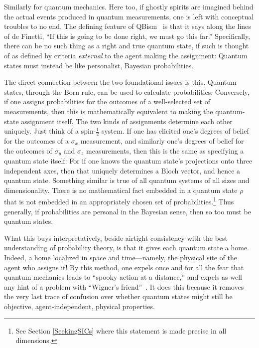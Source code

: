 \documentclass[aps,pra,superscriptaddress,12pt,tightenlines,nofootinbib]{revtex4-2}
\begin{document}
Similarly for quantum mechanics.  Here too, if ghostly spirits are imagined behind the actual events produced in quantum measurements, one is left with conceptual troubles to no end.  The defining feature of QBism~\cite{Caves02,Fuchs02,Fuchs04,Caves07,RMP,Fuchs10,Mermin13,Fuchs10b,AJP,Mermin14,stacey-vonneumann,Baeyer16} is that it says along the lines of de Finetti, ``If this is going to be done right, we must go this far.''  Specifically, there can be no such thing as a right and true quantum state, if such is thought of as defined by criteria {\it external\/} to the agent making the assignment:  Quantum states must instead be like personalist, Bayesian probabilities.

The direct connection between the two foundational issues is this.  Quantum states, through the Born rule, can be used to calculate probabilities.  Conversely, if one assigns probabilities for the outcomes of a well-selected set of measurements, then this is mathematically equivalent to making the quantum-state assignment itself.  The two kinds of assignments determine each other uniquely.  Just think of a spin-$\frac{1}{2}$ system.  If one has elicited one's degrees of belief for the outcomes of a $\sigma_x$ measurement, and similarly one's degrees of belief for the outcomes of $\sigma_y$ and $\sigma_z$ measurements, then this is the same as specifying a quantum state itself:  For if one knows the quantum state's projections onto three independent axes, then that uniquely determines a Bloch vector, and hence a quantum state.  Something similar is true of all quantum systems of all sizes and dimensionality.  There is no mathematical fact embedded in a quantum state $\rho$ that is not embedded in an appropriately chosen set of probabilities.\footnote{See Section \ref{SeekingSICs} where this statement is made precise in all dimensions.}  Thus generally, if probabilities are personal in the Bayesian sense, then so too must be quantum states.

What this buys interpretatively, beside airtight consistency with the best understanding of probability theory, is that it gives each quantum state a home.  Indeed, a home localized in space and time---namely, the physical site of the agent who assigns it!  By this method, one expels once and for all the fear that quantum mechanics leads to ``spooky action at a distance,'' and expels as well any hint of a problem with ``Wigner's friend''~\cite{Wigner71}.  It does this because it removes the very last trace of confusion over whether quantum states might still be objective, agent-independent, physical properties.
\end{document}
